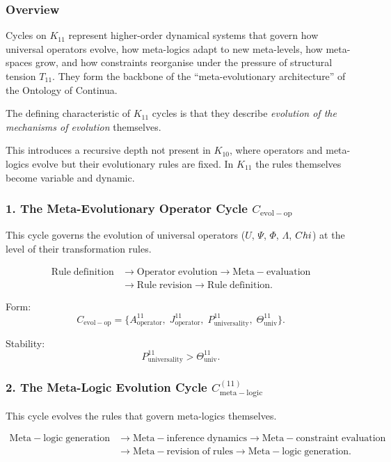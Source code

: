 \subsubsection{Overview}

Cycles on $K_{11}$ represent higher-order dynamical systems that govern
how universal operators evolve, how meta-logics adapt to new meta-levels,
how meta-spaces grow, and how constraints reorganise under the pressure of
structural tension $T_{11}$. They form the backbone of the ``meta-evolutionary
architecture'' of the Ontology of Continua.

The defining characteristic of $K_{11}$ cycles is that they describe
\emph{evolution of the mechanisms of evolution} themselves.

This introduces a recursive depth not present in $K_{10}$, where operators
and meta-logics evolve but their evolutionary rules are fixed.  
In $K_{11}$ the rules themselves become variable and dynamic.


\subsubsection{1. The Meta-Evolutionary Operator Cycle $C_{\mathrm{evol-op}}$}

This cycle governs the evolution of universal operators ($U$, $\Psi$, $\Phi$,
$\Lambda$, $Chi$) at the level of their transformation rules.

\[
  \begin{aligned}
  \mathrm{Rule\;definition}
  &\to \mathrm{Operator\;evolution}
  \to \mathrm{Meta\!-\!evaluation}\\
  &\to \mathrm{Rule\;revision}
  \to \mathrm{Rule\;definition}.
  \end{aligned}
\]

Form:
\[
  C_{\mathrm{evol-op}}
  =
  \{
    A^{11}_{\mathrm{operator}},\;
    J^{11}_{\mathrm{operator}},\;
    P^{11}_{\mathrm{universality}},\;
    \Theta^{11}_{\mathrm{univ}}
  \}.
\]

Stability:
\[
  P^{11}_{\mathrm{universality}}>\Theta^{11}_{\mathrm{univ}}.
\]


\subsubsection{2. The Meta-Logic Evolution Cycle $C_{\mathrm{meta\!-\!logic}}^{(11)}$}

This cycle evolves the rules that govern meta-logics themselves.

\[
  \begin{aligned}
  \mathrm{Meta\!-\!logic\;generation}
  &\to \mathrm{Meta\!-\!inference\;dynamics}
  \to \mathrm{Meta\!-\!constraint\;evaluation}\\
  &\to \mathrm{Meta\!-\!revision\;of\;rules}
  \to \mathrm{Meta\!-\!logic\;generation}.
  \end{aligned}
\]

